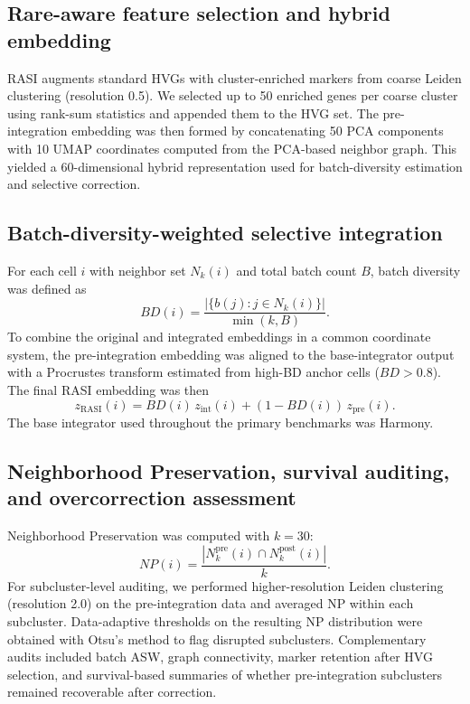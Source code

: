 \documentclass[10pt]{article}
\begin{document}
\subsection*{Rare-aware feature selection and hybrid embedding}

RASI augments standard HVGs with cluster-enriched markers from coarse Leiden clustering (resolution 0.5).\cite{traag2019} We selected up to 50 enriched genes per coarse cluster using rank-sum statistics and appended them to the HVG set. The pre-integration embedding was then formed by concatenating 50 PCA components with 10 UMAP coordinates computed from the PCA-based neighbor graph.\cite{mcinnes2018} This yielded a 60-dimensional hybrid representation used for batch-diversity estimation and selective correction.

\subsection*{Batch-diversity-weighted selective integration}

For each cell $i$ with neighbor set $N_k(i)$ and total batch count $B$, batch diversity was defined as
\begin{equation}
BD(i) = \frac{|\{b(j): j \in N_k(i)\}|}{\min(k,B)}.
\end{equation}
To combine the original and integrated embeddings in a common coordinate system, the pre-integration embedding was aligned to the base-integrator output with a Procrustes transform estimated from high-BD anchor cells ($BD > 0.8$). The final RASI embedding was then
\begin{equation}
z_{\mathrm{RASI}}(i) = BD(i)\, z_{\mathrm{int}}(i) + (1-BD(i))\, z_{\mathrm{pre}}(i).
\end{equation}
The base integrator used throughout the primary benchmarks was Harmony.\cite{korsunsky2019}

\subsection*{Neighborhood Preservation, survival auditing, and overcorrection assessment}

Neighborhood Preservation was computed with $k=30$:
\begin{equation}
NP(i) = \frac{|N_k^{\mathrm{pre}}(i) \cap N_k^{\mathrm{post}}(i)|}{k}.
\end{equation}
For subcluster-level auditing, we performed higher-resolution Leiden clustering (resolution 2.0) on the pre-integration data and averaged NP within each subcluster. Data-adaptive thresholds on the resulting NP distribution were obtained with Otsu's method to flag disrupted subclusters. Complementary audits included batch ASW, graph connectivity, marker retention after HVG selection, and survival-based summaries of whether pre-integration subclusters remained recoverable after correction.
\end{document}
